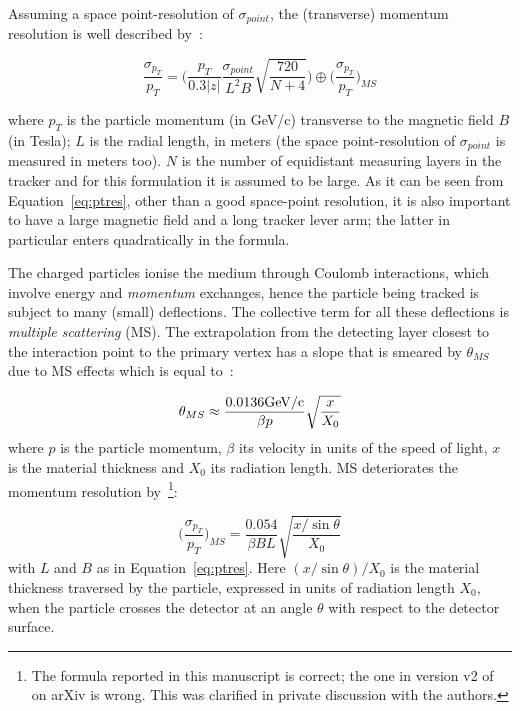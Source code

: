 Assuming a space point-resolution of $\sigma_{point}$, the (transverse) momentum resolution is well described by~\cite{GLUCKSTERN1963381,Olive:2016xmw,Garcia-Sciveres:2017ymt}:

\begin{equation}
\dfrac{\sigma_{p_{T}}}{p_{T}} = \Bigg( \dfrac{p_T}{0.3|z|}\dfrac{\sigma_{point}}{L^2B}\sqrt{\dfrac{720}{N+4}}\Bigg) \oplus \Bigg(\dfrac{\sigma_{p_{T}}}{p_{T}}\Bigg)_{MS}
\label{eq:ptres}
\end{equation} 

where $p_T$ is the particle momentum (in GeV/c) transverse to the magnetic field $B$ (in Tesla); 
$L$ is the radial length, in meters (the space point-resolution of $\sigma_{point}$ is measured in 
meters too). $N$ is the number of equidistant measuring layers in the tracker and for this formulation it is 
assumed to be large. As it can be seen from Equation~\ref{eq:ptres}, other than a good 
space-point resolution, it is also important to have a large magnetic field and a long tracker lever 
arm; the latter in particular enters quadratically in the formula. 

The charged particles ionise the medium through Coulomb interactions, which involve energy and 
{\it momentum} exchanges, hence the particle being tracked is subject to many (small) deflections. 
The collective term for all these deflections is {\it multiple scattering} (MS).
The extrapolation from the detecting layer closest to the interaction point to the primary vertex has a 
slope that is smeared by $\theta_{MS}$ due to MS effects which is equal to~\cite{Olive:2016xmw}:

\begin{equation}
  \theta_{MS} \approx \dfrac{0.0136 {\rm GeV/c}}{\beta p}\sqrt{\dfrac{x}{X_0}}
  \label{eq:thetaMS}
\end{equation}
 where $p$ is the particle momentum, $\beta$ its velocity in units of the speed of light, $x$ is the material thickness and $X_0$ its radiation length. 
MS deteriorates the 
momentum resolution by~\cite{Garcia-Sciveres:2017ymt}\footnote{The formula reported in this manuscript is correct; the one in version v2 of~\cite{Garcia-Sciveres:2017ymt} on arXiv is wrong. This was clarified in private discussion with the  authors.}:

\begin{equation}
\Bigg(\dfrac{\sigma_{p_{T}}}{p_{T}}\Bigg)_{MS} = \dfrac{0.054}{\beta B L}\sqrt{\dfrac{x/\sin\theta}{X_0}}
\label{eq:MS}
\end{equation} 
with $L$ and $B$ as in Equation~\ref{eq:ptres}. Here 
 $(x/\sin\theta)/X_0$ is the material thickness traversed by the particle, expressed in units 
 of radiation length $X_0$, when the particle crosses the detector at an angle $\theta$ with respect 
 to the detector surface.
 
